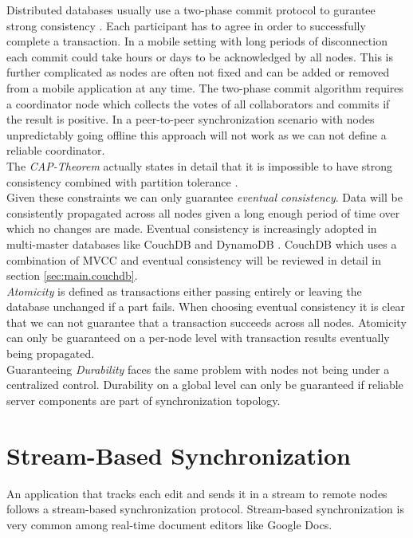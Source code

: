Distributed databases usually use a two-phase commit protocol to gurantee strong consistency \cite{bernstein1987concurrency}.
Each participant has to agree in order to successfully complete a transaction.
In a mobile setting with long periods of disconnection each commit could take hours or days to be acknowledged by all nodes.
This is further complicated as nodes are often not fixed and can be added or removed from a mobile application at any time.
The two-phase commit algorithm requires a coordinator node which collects the votes of all collaborators and commits if the result is positive.
In a peer-to-peer synchronization scenario with nodes unpredictably going offline this approach will not work as we can not define a reliable coordinator.\\
The \emph{CAP-Theorem} actually states in detail that it is impossible to have strong consistency combined with partition tolerance \cite{Gilbert:2002uw}.\\
Given these constraints we can only guarantee \emph{eventual consistency}.
Data will be consistently propagated across all nodes given a long enough period of time over which no changes are made.
Eventual consistency is increasingly adopted in multi-master databases like CouchDB \cite{anderson2010couchdb} and DynamoDB \cite{DeCandia:2007ui}.
CouchDB which uses a combination of MVCC and eventual consistency will be reviewed in detail in section \ref{sec:main.couchdb}.\\
\emph{Atomicity} is defined as transactions either passing entirely or leaving the database unchanged if a part fails.
When choosing eventual consistency it is clear that we can not guarantee that a transaction succeeds across all nodes.
Atomicity can only be guaranteed on a per-node level with transaction results eventually being propagated.\\
Guaranteeing \emph{Durability} faces the same problem with nodes not being under a centralized control.
Durability on a global level can only be guaranteed if reliable server components are part of synchronization topology.

\section{Stream-Based Synchronization}
\label{sec:background.stream-based}
An application that tracks each edit and sends it in a stream to remote nodes follows a stream-based synchronization protocol.
Stream-based synchronization is very common among real-time document editors like Google Docs.\\

